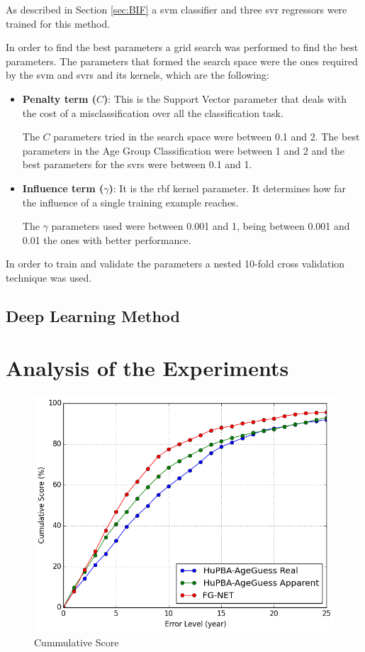 As described in Section \ref{sec:BIF} a \gls{svm} classifier and three \gls{svr} regressors were trained for this method. 

In order to find the best parameters a grid search was performed to find the best parameters. The parameters that formed the search space were the ones required by the \gls{svm} and \glspl{svr} and its kernels, which are the following:

\begin{itemize}
	\item \textbf{Penalty term ($C$)}: This is the Support Vector parameter that deals with the cost of a misclassification over all the classification task. 
	
	The $C$ parameters tried in the search space were between 0.1 and 2. The best parameters in the Age Group Classification were between 1 and 2 and the best parameters for the \glspl{svr} were between 0.1 and 1.
	
	\item \textbf{Influence term ($\gamma$)}: It is the \gls{rbf} kernel parameter. It determines how far the influence of a single training example reaches.
	
	The $\gamma$ parameters used were between 0.001 and 1, being between 0.001 and 0.01 the ones with better performance.
\end{itemize}

In order to train and validate the parameters a nested 10-fold cross validation technique was used.


\subsection{Deep Learning Method}

\section{Analysis of the Experiments}

\begin{figure}[!h]
	\centering
	\includegraphics[width=\textwidth]{figures/cum_score}
	\caption{Cummulative Score }
	\label{fig:cumS}
\end{figure}
